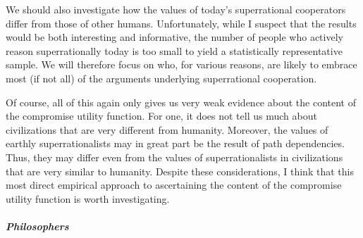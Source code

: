 We should also investigate how the values of today's superrational
cooperators differ from those of other humans. Unfortunately, while I
suspect that the results would be both interesting and informative, the
number of people who actively reason superrationally today is too small
to yield a statistically representative sample. We will therefore focus
on who, for various reasons, are likely to embrace most (if not all) of
the arguments underlying superrational cooperation.

Of course, all of this again only gives us very weak evidence about the
content of the compromise utility function. For one, it does not tell us
much about civilizations that are very different from humanity. Moreover,
the values of earthly superrationalists may in great part be the result
of path dependencies. Thus, they may differ even from the values of
superrationalists in civilizations that are very similar to humanity.
Despite these considerations, I think that this most direct empirical
approach to ascertaining the content of the compromise utility function
is worth investigating.

\subparagraph{Philosophers}\label{philosophers}

